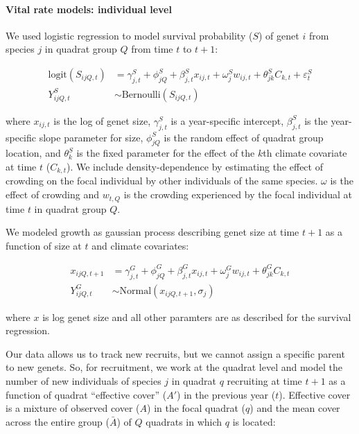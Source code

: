 \documentclass[author-year, 12pt,review]{components/elsarticle} %
\begin{document}
\paragraph{Vital rate models: individual
level}\label{vital-rate-models-individual-level}

We used logistic regression to model survival probability ($S$) of genet
$i$ from species $j$ in quadrat group $Q$ from time $t$ to $t+1$:

\begin{align}
\text{logit}(S_{ijQ,t}) &= \gamma^{S}_{j,t} + \phi^{S}_{jQ} + \beta^{S}_{j,t}x_{ij,t} + \omega^{S}_{j}w_{ij,t} + \theta^{S}_{jk}C_{k,t} + \varepsilon^{S}_{t} \\
Y^{S}_{ijQ,t} &\sim \text{Bernoulli}(S_{ijQ,t})
\end{align}

where $x_{ij,t}$ is the log of genet size, $\gamma^{S}_{j,t}$ is a
year-specific intercept, $\beta^{S}_{j,t}$ is the year-specific slope
parameter for size, $\phi^{S}_{jQ}$ is the random effect of quadrat
group location, and $\theta^{S}_{k}$ is the fixed parameter for the
effect of the $k$th climate covariate at time $t$ ($C_{k,t}$). We
include density-dependence by estimating the effect of crowding on the
focal individual by other individuals of the same species. $\omega$ is
the effect of crowding and $w_{t,Q}$ is the crowding experienced by the
focal individual at time $t$ in quadrat group $Q$.

We modeled growth as gaussian process describing genet size at time
$t+1$ as a function of size at $t$ and climate covariates:

\begin{align}
x_{ijQ,t+1} &= \gamma^{G}_{j,t} + \phi^{G}_{jQ} + \beta^{G}_{j,t}x_{ij,t} + \omega^{G}_{j}w_{ij,t} + \theta^{G}_{jk}C_{k,t} \\
Y^{G}_{ijQ,t} &\sim \text{Normal}(x_{ijQ,t+1}, \sigma_{j})
\end{align}

where $x$ is log genet size and all other paramters are as described for
the survival regression.

Our data allows us to track new recruits, but we cannot assign a
specific parent to new genets. So, for recruitment, we work at the
quadrat level and model the number of new individuals of species $j$ in
quadrat $q$ recruiting at time $t+1$ as a function of quadrat
``effective cover'' ($A'$) in the previous year ($t$). Effective cover
is a mixture of observed cover ($A$) in the focal quadrat ($q$) and the
mean cover across the entire group ($\bar{A}$) of $Q$ quadrats in which
$q$ is located:
\end{document}

